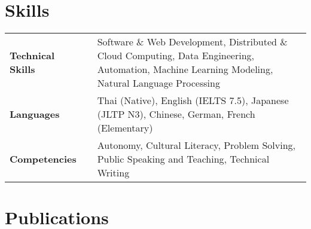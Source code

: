 \documentclass{article}
\newcommand{\hskills}[1]{
\textbf{\bfseries #1} }
\begin{document}
    \section{Skills}
    \begin{tabular}{p{11em} p{1em} p{43em}}
        \hskills{Technical Skills}&  & Software \& Web Development, Distributed \& Cloud Computing, Data Engineering, Automation, Machine Learning Modeling, Natural Language Processing \\
        \hskills{Languages} &  & Thai (Native), English (IELTS 7.5), Japanese (JLTP N3), Chinese, German, French (Elementary) \\
        \hskills{Competencies} &  & Autonomy, Cultural Literacy, Problem Solving, Public Speaking and Teaching, Technical Writing \\
    \end{tabular}
    \vspace{-0.2cm}

    \section{Publications} 
    \renewcommand\refname{\vskip -1.5em}
    \nocite{*}
    \printbibliography[heading=none]
    \vspace{-0.4cm}

  
\end{document}
